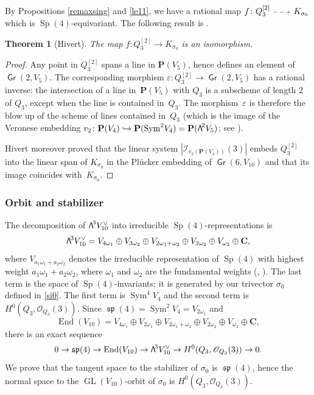 \documentclass[11pt]{article}
\makeatletter
\providecommand{\C}{}
\let\mathcal\mathscr
\newcommand\hto{\mathrel{\lhook\joinrel\to}}
\newcommand{\dradpl}{{\!\!\xymatrix@C=8mm{\ar@{-->}[r]&}\!\!}}
\newcommand{\dratst}{{\,\mathrel{\scalebox{.8}{$\dradpl$}}\,}}
\newcommand{\drascst}{{\,\mathrel{\scalebox{.6}{$\dradpl$}}\,}}
\newcommand{\dra}{\mathchoice{\dradpl}{\dratst}{\drascst}{\drascst}}
\newtheorem{theo}[lemm]{Theorem}
\theoremstyle{definition}
\renewcommand\C{{\mathbf C}}\let\CC\C
\renewcommand\P{{\mathbf P}}\let\PP\P
\newcommand\cI{\mathcal{I}}
\newcommand\cO{\mathcal{O}}\let\OO\cO
\DeclareMathOperator{\Gr}{\mathsf{Gr}}
\DeclareMathOperator{\gsp}{\mathfrak{sp}}
\let\eps\varepsilon
\DeclareMathOperator{\End}{End}
\DeclareMathOperator{\GL}{GL}
\DeclareMathOperator{\Sp}{Sp}
\DeclareMathOperator{\Sym}{Sym}
\newcommand\bw[1]{{\hbox{\large$\mathsf{\Lambda}$}^{\!#1}}}
\newcommand\Qtrois{{Q_3}}
\newcommand\hilb{{Q_3^{[2]}}}
\renewcommand{\dratst}{\mathrel{\scalebox{.8}{$\dradpl$}}}
\renewcommand{\drascst}{\mathrel{\scalebox{.6}{$\dradpl$}}}
\makeatother
\begin{document}
By Propositions \ref{remaxsing} and \ref{le11}, we have
a
rational map $f\colon \hilb\dra K_{\sigma_0}$ which is $\Sp(4)$-equivariant. The following result is \cite[Th.\,6.3]{hivert}.

\begin{theo}[Hivert] \label{thoehivertDVtzero}
The map $f\colon \hilb\to K_{\sigma_0}$ is an isomorphism.
\end{theo}

\begin{proof}
Any point in $\hilb$ spans a line in $\P(V_5)$, hence defines an element of $\Gr(2,V_5)$. The corresponding morphism $\eps\colon\hilb\to \Gr(2,V_5)$ has a rational inverse: the intersection of a line in~$\P(V_5)$ with $\Qtrois$ is a subscheme of length $2$ of $\Qtrois$, except when
the line is
contained in~$\Qtrois$. The morphism~$\eps$ is therefore the blow up of the scheme of lines contained in~$\Qtrois$ (which is the
image of the Veronese embedding
$v_2\colon \P(V_4)\hto \P(\Sym^2\!V_4)=\P(\bw2V_5)
$; see \cite[\S 6.2]{hivert}).

Hivert moreover proved that the linear system $|\cI_{v_2(\P(V_4) )}(3)|$ embeds $\hilb$ into
the linear
span of $K_{\sigma_0}$ in the Plücker embedding of $\Gr(6,V_{10} )$ and that
its image coincides with~$K_{\sigma_0}$.
\end{proof}

\subsubsection{Orbit and stabilizer}\label{orbetstab}

The decomposition of $\bw3V_{10}^\vee$ into irreducible $\Sp(4)$-representations
is
\begin{equation} \label{eqhivert}
\bw3V_{10}^\vee=V_{4\omega_1}\oplus V_{3\omega_2}\oplus V_{2\omega_1+\omega_2}\oplus V_{2\omega_2}\oplus V_{\omega_2}\oplus \C,
\end{equation}
where $V_{a_1\omega_1+a_2\omega_2}$ denotes the irreducible representation of $\Sp(4)$ with highest weight $a_1\omega_1+a_2\omega_2$, where $\omega_1$ and $\omega_2$ are the fundamental weights (\cite[\S 6.2]{hivert}, \cite{bbki}).
The last term is the space of $\Sp(4)$-invariants; it is generated by our trivector
$\sigma_0$ defined in \eqref{si0}.
The first term is $ \Sym^4\!V_4$ and the second term is $ H^0(\Qtrois,\cO_{\Qtrois}(3))$. Since $\gsp (4)=\Sym^2\!V_4=V_{2\omega_1}$ and
\[
\End(V_{10})=V_{4\omega_1}\oplus V_{2\omega_1}\oplus V_{2\omega_1+\omega_2}\oplus V_{2\omega_2}\oplus V_{\omega_2}\oplus \C
,
\] there is an exact sequence
\[
0\to \gsp (4)\to \End(V_{10})\to \bw3V_{10}^\vee \to H^0(\Qtrois,\cO_{\Qtrois}(3))\to 0.
\]
We prove that the tangent space to the stabilizer of $\sigma_0$ is $\gsp (4)$, hence the normal
space to the $\GL(V_{10})$-orbit of $\sigma_0$
is
$ H^0(\Qtrois,\cO_{\Qtrois}(3))$.
\end{document}
